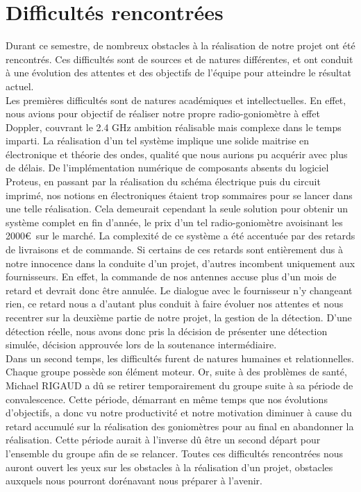 
\chapter{Difficultés rencontrées}
\label{chap:difficulte}

Durant ce semestre, de nombreux obstacles à la réalisation de notre projet ont été rencontrés. Ces difficultés sont de sources et de natures différentes, et ont conduit à une évolution des attentes et des objectifs de l’équipe pour atteindre le résultat actuel.~\\

Les premières difficultés sont de natures académiques et intellectuelles. En effet, nous avions pour objectif de réaliser notre propre radio-goniomètre à effet Doppler, couvrant le 2.4 GHz ambition réalisable mais complexe dans le temps imparti. La réalisation d’un tel système implique une solide maitrise en électronique et théorie des ondes, qualité que nous aurions pu acquérir avec plus de délais. De l’implémentation numérique de composants absents du logiciel Proteus, en passant par la réalisation du schéma électrique puis du circuit imprimé, nos notions en électroniques étaient trop sommaires pour se lancer dans une telle réalisation. Cela demeurait cependant la seule solution pour obtenir un système complet en fin d’année, le prix d’un tel radio-goniomètre avoisinant les 2000\euro ~sur le marché. 
La complexité de ce système a été accentuée par des retards de livraisons et de commande. Si certains de ces retards sont entièrement dus à notre innocence dans la conduite d’un projet, d’autres incombent uniquement aux fournisseurs. En effet, la commande de nos antennes accuse plus d’un mois de retard et devrait donc être annulée. Le dialogue avec le fournisseur n’y changeant rien, ce retard nous a d’autant plus conduit à faire évoluer nos attentes et nous recentrer sur la deuxième partie de notre projet, la gestion de la détection. D’une détection réelle, nous avons donc pris la décision de présenter une détection simulée, décision approuvée lors de la soutenance intermédiaire. 
~\\

Dans un second temps, les difficultés furent de natures humaines et relationnelles. Chaque groupe possède son élément moteur. Or, suite à des problèmes de santé, Michael RIGAUD a dû se retirer temporairement du groupe suite à sa période de convalescence. Cette période, démarrant en même temps que nos évolutions d’objectifs, a donc vu notre productivité et notre motivation diminuer à cause du retard accumulé sur la réalisation des goniomètres pour au final en abandonner la réalisation. Cette période aurait à l’inverse dû être un second départ pour l’ensemble du groupe afin de se relancer. 
Toutes ces difficultés rencontrées nous auront ouvert les yeux sur les obstacles à la réalisation d’un projet, obstacles auxquels nous pourront dorénavant nous préparer à l’avenir.


